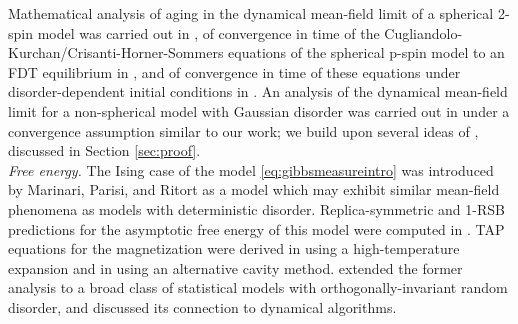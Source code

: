 \documentclass[11pt,letterpaper,reqno]{amsart}
\theoremstyle{definition}
\numberwithin{equation}{section}
\begin{document}
Mathematical analysis of aging in the dynamical mean-field limit of a
spherical 2-spin model was carried out in \cite{arous2001aging},
of convergence in time of the Cugliandolo-Kurchan/Crisanti-Horner-Sommers
equations of the spherical p-spin model to an FDT equilibrium in \cite{dembo2007limiting},
and of convergence in time of these equations under disorder-dependent initial
conditions in \cite{dembo2019dynamics,dembo2025dynamics}. An analysis of the
dynamical mean-field limit for a non-spherical model with Gaussian disorder
was carried out in \cite{fan2025dynamicalII}
under a convergence assumption similar to our work; we build upon several ideas
of \cite{fan2025dynamicalII}, discussed in Section \ref{sec:proof}.\\

\emph{Free energy.} The Ising case of the model \eqref{eq:gibbsmeasureintro}
was introduced by Marinari, Parisi, and Ritort \cite{marinari1994replica} as a model which may
exhibit similar mean-field phenomena as models with deterministic disorder.
Replica-symmetric and 1-RSB predictions for the asymptotic
free energy of this model were computed in
\cite{marinari1994replica,cherrier2003role}.
TAP equations for the magnetization were derived in \cite{parisi1995mean} using a
high-temperature expansion and in \cite{opper2001adaptive} using an alternative
cavity method. \cite{maillard2019high} extended the former analysis to a broad class of
statistical models with orthogonally-invariant random disorder, and discussed its
connection to dynamical algorithms.
\end{document}
